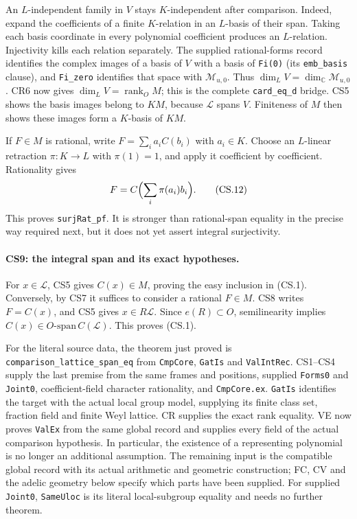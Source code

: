 \documentclass[11pt,a4paper]{article}
\numberwithin{equation}{section}
\theoremstyle{remark}\newtheorem{remark}[theorem]{Remark}
\begin{document}
An $L$-independent family in $V$ stays $K$-independent after comparison.
Indeed, expand the coefficients of a finite $K$-relation in an
$L$-basis of their span. Taking each basis coordinate in every
polynomial coefficient produces an $L$-relation. Injectivity kills
each relation separately. The supplied rational-forms record identifies
the complex images of a basis of $V$ with a basis of \texttt{Fi(0)}
(its \texttt{emb\_basis} clause), and \texttt{Fi\_zero} identifies
that space with $\mathcal M_{u,0}$. Thus $\dim_LV=\dim_{\mathbb C}\mathcal M_{u,0}$.
CR6 now gives $\dim_LV=\operatorname{rank}_O M$; this is the complete
\texttt{card\_eq\_d} bridge. CS5 shows the basis images
belong to $KM$, because $\mathcal L$ spans $V$. Finiteness of $M$
then shows these images form a $K$-basis of $KM$.

If $F\in M$ is rational, write $F=\sum_i a_iC(b_i)$ with $a_i\in K$.
Choose an $L$-linear retraction $\pi:K\to L$ with $\pi(1)=1$,
and apply it coefficient by coefficient. Rationality gives
\[
 F=C\Bigl(\sum_i\pi(a_i)b_i\Bigr).                     \tag{CS.12}
\]
This proves \texttt{surjRat\_pf}. It is stronger than rational-span
equality in the precise way required next, but it does not yet assert
integral surjectivity.

\paragraph{CS9: the integral span and its exact hypotheses.}
For $x\in\mathcal L$, CS5 gives $C(x)\in M$, proving the easy
inclusion in (CS.1). Conversely, by CS7 it suffices to consider a
rational $F\in M$. CS8 writes $F=C(x)$, and CS5 gives
$x\in R\mathcal L$. Since $e(R)\subset O$, semilinearity implies
$C(x)\in O\text{-span}\,C(\mathcal L)$. This proves (CS.1).

For the literal source data, the theorem just proved is
\texttt{comparison\_lattice\_span\_eq} from
\texttt{CmpCore}, \texttt{GatIs} and \texttt{ValIntRec}.
CS1--CS4 supply the last premise from the same frames and positions,
supplied \texttt{Forms0} and \texttt{Joint0}, coefficient-field character
rationality, and \texttt{CmpCore.ex}.
\texttt{GatIs} identifies the target with the actual local group
model, supplying its finite class set, fraction field and finite
Weyl lattice. CR supplies the exact rank equality. VE now proves \texttt{ValEx} from the same global record and
supplies every field of the actual comparison hypothesis. In particular,
the existence of a representing polynomial is no longer an additional
assumption. The remaining input is the compatible global record with its
actual arithmetic and geometric construction; FC, CV and the adelic
geometry below specify which parts have been supplied. For supplied
\texttt{Joint0}, \texttt{SameUloc} is its literal local-subgroup equality
and needs no further theorem.
\end{document}

